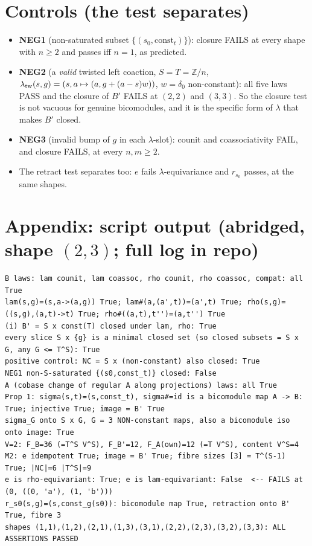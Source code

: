 \documentclass[10pt]{article}
\newcommand{\cst}{\mathrm{const}}
\begin{document}
\section*{Controls (the test separates)}
\begin{itemize}[leftmargin=*]
\item \textbf{NEG1} (non-saturated subset $\{(s_0,\cst_t)\}$): closure FAILS at every shape with $n\ge2$ and passes iff $n=1$, as predicted.
\item \textbf{NEG2} (a \emph{valid} twisted left coaction, $S=T=\mathbb Z/n$,
  $\lambda_{\rm tw}(s,g)=(s,a\mapsto(a,g+(a-s)w))$, $w=\delta_0$ non-constant): all five laws PASS and the
  closure of $B'$ FAILS at $(2,2)$ and $(3,3)$. So the closure test is not vacuous for genuine bicomodules, and
  it is the specific form of $\lambda$ that makes $B'$ closed.
\item \textbf{NEG3} (invalid bump of $g$ in each $\lambda$-slot): counit and coassociativity FAIL, and closure FAILS, at every $n,m\ge2$.
\item The retract test separates too: $e$ fails $\lambda$-equivariance and $r_{s_0}$ passes, at the same shapes.
\end{itemize}

\section*{Appendix: script output (abridged, shape $(2,3)$; full log in repo)}
{\footnotesize\begin{verbatim}
B laws: lam counit, lam coassoc, rho counit, rho coassoc, compat: all True
lam(s,g)=(s,a->(a,g)) True; lam#(a,(a',t))=(a',t) True; rho(s,g)=((s,g),(a,t)->t) True; rho#((a,t),t'')=(a,t'') True
(i) B' = S x const(T) closed under lam, rho: True
every slice S x {g} is a minimal closed set (so closed subsets = S x G, any G <= T^S): True
positive control: NC = S x (non-constant) also closed: True
NEG1 non-S-saturated {(s0,const_t)} closed: False
A (cobase change of regular A along projections) laws: all True
Prop 1: sigma(s,t)=(s,const_t), sigma#=id is a bicomodule map A -> B: True; injective True; image = B' True
sigma_G onto S x G, G = 3 NON-constant maps, also a bicomodule iso onto image: True
V=2: F_B=36 (=T^S V^S), F_B'=12, F_A(own)=12 (=T V^S), content V^S=4
M2: e idempotent True; image = B' True; fibre sizes [3] = T^(S-1) True; |NC|=6 |T^S|=9
e is rho-equivariant: True; e is lam-equivariant: False  <-- FAILS at (0, ((0, 'a'), (1, 'b')))
r_s0(s,g)=(s,const_g(s0)): bicomodule map True, retraction onto B' True, fibre 3
shapes (1,1),(1,2),(2,1),(1,3),(3,1),(2,2),(2,3),(3,2),(3,3): ALL ASSERTIONS PASSED
\end{verbatim}}
\end{document}
